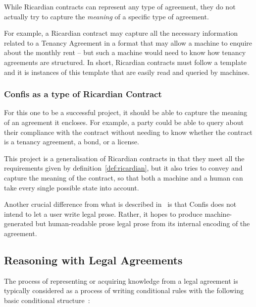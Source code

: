 While Ricardian contracts can represent any type of agreement, they do not actually try to capture the \emph{meaning} of a specific type of agreement.

For example, a Ricardian contract may capture all the necessary information related to a Tenancy Agreement in a format that may allow a machine to enquire about the monthly rent -- but such a machine would need to know how tenancy agreements are structured.
In short, Ricardian contracts must follow a template and it is instances of this template that are easily read and queried by machines.\\

\subsubsection{Confis as a type of Ricardian Contract}

For this one to be a successful project, it should be able to capture the meaning of an agreement it encloses.
For example, a party could be able to query about their compliance with the contract without needing to know whether the contract is a tenancy agreement, a bond, or a license.


This project is a generalisation of Ricardian contracts in that they meet all the requirements given by definition~\autoref{def:ricardian}, but it also tries to convey and capture the meaning of the contract, so that both a machine and a human can take every single possible state into account.

Another crucial difference from what is described in~\cite{grigg2004ricardian} is that Confis does not intend to let a user write legal prose.
Rather, it hopes to produce machine-generated but human-readable prose legal prose from its internal encoding of the agreement.

\subsection{Reasoning with Legal Agreements}\label{subsec:reasoning-with-legal-agreements}

The process of representing or acquiring knowledge from a legal agreement is typically considered as a process of writing conditional rules with the following basic conditional structure~\cite{sartorLegalReasoning, ferraroLegalNLPSSurvey}:

